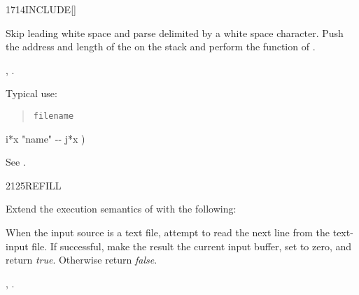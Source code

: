 \vspace*{-3ex}
\enlargethispage{6ex}
\begin{worddef}{1714}{INCLUDE}[]%
\item {}

	Skip leading white space and parse  delimited by a
	white space character. Push the address and length of the
	 on the stack and perform the function of
	.

\see {},
	.

	\begin{rationale} %
		Typical use:
		\begin{quote}
			 \texttt{filename}
		\end{quote}
	\end{rationale}

	\begin{implement} %
		\word{:}   i*x "name" -{}- j*x ) \\
		\tab {}  \word{;}
	\end{implement}

	\begin{testing} %
		See .
		\pagebreak
	\end{testing}
\end{worddef}


\begin{worddef}{2125}{REFILL}
\item {}

	Extend the execution semantics of 
	with the following:

	When the input source is a text file, attempt to read the next
	line from the text-input file. If successful, make the result
	the current input buffer, set  to zero, and
	return \emph{true}. Otherwise return \emph{false}.

\see {},
	.
\end{worddef}


